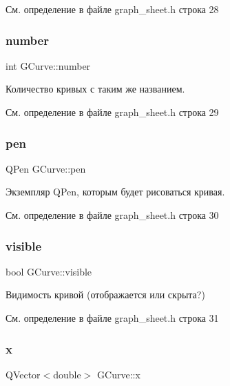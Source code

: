 См. определение в файле graph\+\_\+sheet.\+h строка 28

\hypertarget{struct_g_curve_a67acaf70967bdbaa8c02c614502baacc}{}\label{struct_g_curve_a67acaf70967bdbaa8c02c614502baacc} 
\subsubsection{\texorpdfstring{number}{number}}
{\footnotesize\ttfamily int G\+Curve\+::number}

Количество кривых с таким же названием. 

См. определение в файле graph\+\_\+sheet.\+h строка 29

\hypertarget{struct_g_curve_ac3f500b2153788be5232dc7a623354ce}{}\label{struct_g_curve_ac3f500b2153788be5232dc7a623354ce} 
\subsubsection{\texorpdfstring{pen}{pen}}
{\footnotesize\ttfamily Q\+Pen G\+Curve\+::pen}

Экземпляр Q\+Pen, которым будет рисоваться кривая. 

См. определение в файле graph\+\_\+sheet.\+h строка 30

\hypertarget{struct_g_curve_ac00a68184b569dda559808f50729f96a}{}\label{struct_g_curve_ac00a68184b569dda559808f50729f96a} 
\subsubsection{\texorpdfstring{visible}{visible}}
{\footnotesize\ttfamily bool G\+Curve\+::visible}

Видимость кривой (отображается или скрыта?) 

См. определение в файле graph\+\_\+sheet.\+h строка 31

\hypertarget{struct_g_curve_af4a77d5615109cd4068e11dcc2b52615}{}\label{struct_g_curve_af4a77d5615109cd4068e11dcc2b52615} 
\subsubsection{\texorpdfstring{x}{x}}
{\footnotesize\ttfamily Q\+Vector$<$double$>$ G\+Curve\+::x}

